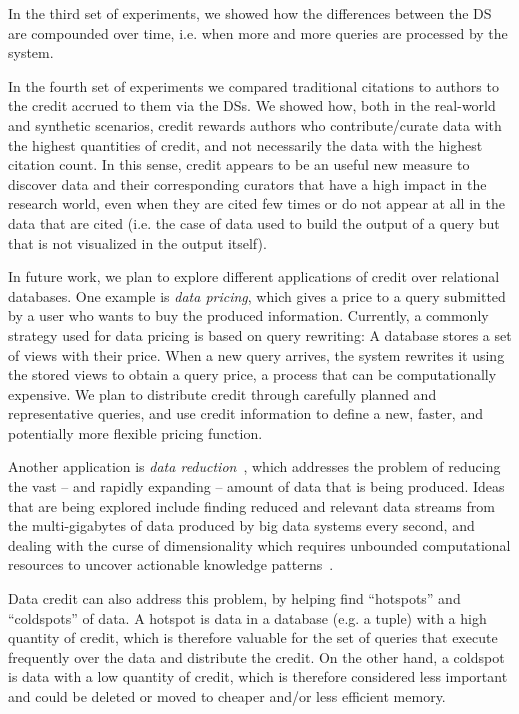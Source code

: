 In the third set of experiments, we showed how the differences between the DS are compounded over time, i.e. when more and more queries are processed by the system.

In the fourth set of experiments we compared traditional citations to authors to the credit accrued to them via the DSs. We showed how, both in the real-world and synthetic scenarios, credit rewards authors 
who contribute/curate data with the highest quantities of credit, and not necessarily the data with the highest citation count. 
In this sense, credit appears to be an useful new measure to discover data and their corresponding curators that have a high impact in the research world, even when they are cited few times or do not appear at all in the data that are cited (i.e. the case of data used to build the output of a query but that is not visualized in the output itself).

In future work, we plan to explore different applications of credit over relational databases.
One example is \emph{data pricing}, which gives a price to a query submitted by a user who wants to buy the produced information. Currently, a commonly strategy used for data pricing is based on query rewriting:  A database stores a set of views with their price. When a new query arrives, the system rewrites it using the stored views to obtain a query price, a process that can be computationally expensive.
We plan to distribute credit through carefully planned and representative queries, and use credit information to define a new, faster, and potentially more flexible pricing function.

Another application is \emph{data reduction}~\cite{milo2019getting}, which addresses the problem of reducing the vast -- and rapidly expanding -- amount of data that is being produced. %
Ideas that are being explored include %
finding reduced and relevant data streams from the multi-gigabytes of data produced by big data systems every second,  and dealing with the curse of dimensionality which requires unbounded computational resources to uncover actionable knowledge patterns~\citep{ur2016big}. 

Data credit can also address this problem, by helping find ``hotspots'' and ``coldspots'' of data. A hotspot is data in a database (e.g. a tuple) with a high quantity of credit, which is therefore valuable for the set of queries that execute frequently over the data and distribute the credit. 
On the other hand, a coldspot is data with a low quantity of credit, which is therefore  considered less  important and could be deleted or moved to cheaper and/or less efficient memory. 
